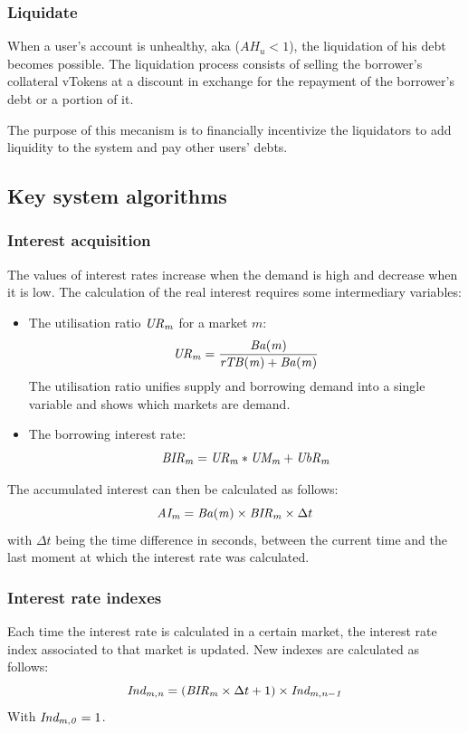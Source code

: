 \subsubsection{Liquidate}

When a user's account is unhealthy, aka ($AH_u < 1$), the liquidation of his debt becomes possible. The liquidation process consists of selling the borrower's collateral vTokens at a discount in exchange for the repayment of the borrower's debt or a portion of it.

The purpose of this mecanism is to financially incentivize the liquidators to add liquidity to the system and pay other users' debts.

\subsection{Key system algorithms}

\subsubsection{Interest acquisition}

The values of interest rates increase when the demand is high and decrease when it is low. The calculation of the real interest requires some intermediary variables:

\begin{itemize}
  \item The utilisation ratio $\mathit{UR_{m}}$ for a market $m$: 
  $$
    \mathit{UR_{m}} = \frac{ \mathit{Ba(m)} }{ \mathit{rTB(m)} + \mathit{Ba(m)} }
  $$
  The utilisation ratio unifies supply and borrowing demand into a single variable and shows which markets are demand.
  \item The borrowing interest rate:
  $$
    \mathit{BIR_{m}} = \mathit{UR_{m}} * \mathit{UM_{m}} + \mathit{UbR_{m}}
  $$ %
\end{itemize}
The accumulated interest can then be calculated as follows:
$$
  \mathit{AI_{m}} = \mathit{Ba(m)} \times \mathit{BIR_{m}} \times \Delta t
$$ %
with $\Delta t$ being the time difference in seconds, between the current time and the last moment at which the interest rate was calculated.

\subsubsection{Interest rate indexes}

Each time the interest rate is calculated in a certain market, the interest rate index associated to that market is updated. New indexes are calculated as follows: 
$$
\mathit{Ind_{m, n}} = (\mathit{BIR_{m}} \times \Delta t + 1) \times\mathit{Ind_{m, n-1}}
$$
With $\mathit{Ind_{m, 0}} = 1$.

